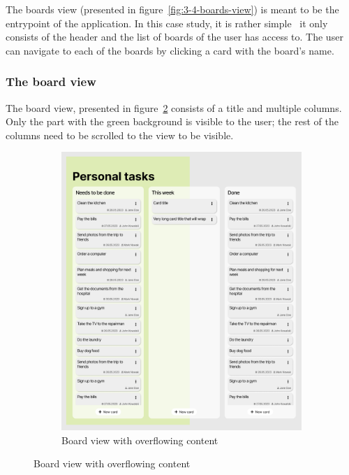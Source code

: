 The boards view (presented in figure~\ref{fig:3-4-boards-view}) is meant to be the entrypoint of the application.
In this case study, it is rather simple \textendash\ it only consists of the header and the list of boards of the user has access to.
The user can navigate to each of the boards by clicking a card with the board's name.

\subsubsection{The board view}
The board view, presented in figure~\ref{fig:3-4-board-view-expanded} consists of a title and multiple columns.
Only the part with the green background is visible to the user;
the rest of the columns need to be scrolled to the view to be visible.

\begin{figure}
    \centering
    \begin{subfigure}[m]{0.6\textwidth}
        \centering
        \includegraphics[height=0.4\textheight]{./3-research-methodology/board-view}
        \caption{Board view with overflowing content}
        \label{fig:3-4-board-view-expanded}
    \end{subfigure}

\end{figure}
